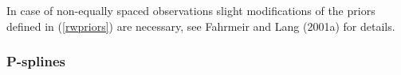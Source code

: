 \documentclass[11pt,a4paper,twoside]{bayesxarticle}
\begin{document}
In case of non-equally spaced observations slight modifications of
the priors defined in (\ref{rwpriors}) are necessary, see Fahrmeir
and Lang (2001a) for details.



\subsubsection{P-splines}
\end{document}
